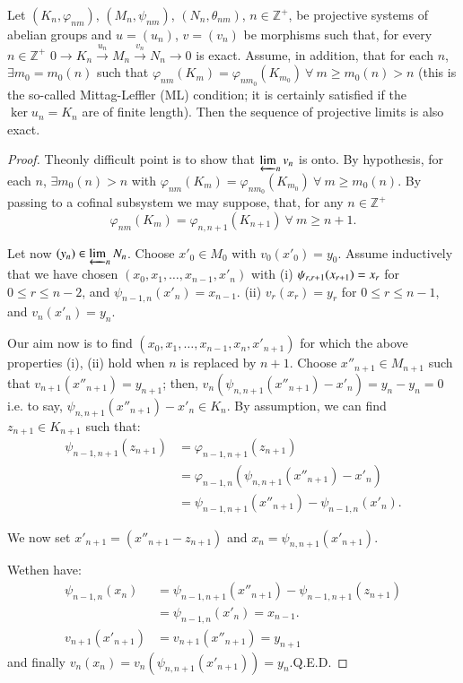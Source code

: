 \setcounter{lemma}{1}
\begin{lemma}\label{chap6-lem6.2.2}
Let $(K_{n},\varphi_{nm})$, $(M_{n},\psi_{nm})$,
$(N_{n},\theta_{nm})$, $n\in \mathbb{Z}^{+}$, be projective systems of
abelian groups and $u=(u_{n})$, $v=(v_{n})$ be morphisms such that,
for every $n\in \mathbb{Z}^{+}$ $0\to
K_{n}\xrightarrow{u_{n}}M_{n}\xrightarrow{v_{n}}N_{n}\to 0$ is
exact. Assume, in addition, that for each $n$, $\exists
m_{0}=m_{0}(n)$ such that
$\varphi_{nm}(K_{m})=\varphi_{nm_{0}}(K_{m_{0}})\ \forall\ m\geq
m_{0}(n)>n$ (this is the so-called Mittag-Leffler (ML) condition; it
is certainly satisfied if the $\ker u_{n}=K_{n}$ are of finite
length). Then the sequence of projective limits is also exact.
\end{lemma}

\begin{proof}
The\pageoriginale only difficult point is to show that
$\varprojlim_{n}v_{n}$ is onto. By hypothesis, for each $n$, $\exists
m_{0}(n)>n$ with
$\varphi_{nm}(K_{m})=\varphi_{nm_{0}}(K_{m_{0}})\ \forall\ m\geq
m_{0}(n)$. By passing to a cofinal subsystem we may suppose, that, for
any $n\in \mathbb{Z}^{+}$ 
$$
\varphi_{nm}(K_{m})=\varphi_{n,n+1}(K_{n+1})\ \forall\ m\geq n+1.
$$

Let now $(y_{n})\in\varprojlim_{n}N_{n}$. Choose $x'_{0}\in M_{0}$
with $v_{0}(x'_{0})=y_{0}$. Assume inductively that we have chosen
$(x_{0},x_{1},\ldots,x_{n-1},x'_{n})$ with (i)
$\psi_{r,r+1}(x_{r+1})\break =x_{r}$ for $0\leq r\leq n-2$, and
  $\psi_{n-1,n}(x'_{n})=x_{n-1}$. (ii) $v_{r}(x_{r})=y_{r}$ for $0\leq
  r\leq n-1$, and $v_{n}(x'_{n})=y_{n}$.

Our aim now is to find $(x_{0},x_{1},\ldots,x_{n-1},x_{n},x'_{n+1})$
for which the above properties (i), (ii) hold when $n$ is replaced by
$n+1$. Choose $x''_{n+1}\in M_{n+1}$ such that
$v_{n+1}(x''_{n+1})=y_{n+1}$; then,
$v_{n}(\psi_{n,n+1}(x''_{n+1})-x'_{n})=y_{n}-y_{n}=0$ i.e. to say,
$\psi_{n,n+1}(x''_{n+1})-x'_{n}\in K_{n}$. By assumption, we can find
$z_{n+1}\in K_{n+1}$ such that:
\begin{align*}
\psi_{n-1,n+1}(z_{n+1}) &= \varphi_{n-1,n+1}(z_{n+1})\\
&= \varphi_{n-1,n}(\psi_{n,n+1}(x''_{n+1})-x'_{n})\\
&= \psi_{n-1,n+1}(x''_{n+1})-\psi_{n-1,n}(x'_{n}).
\end{align*}

We now set $x'_{n+1}=(x''_{n+1}-z_{n+1})$ and
$x_{n}=\psi_{n,n+1}(x'_{n+1})$. 

We\pageoriginale then have:
\begin{align*}
\psi_{n-1,n}(x_{n}) &=
\psi_{n-1,n+1}(x''_{n+1})-\psi_{n-1,n+1}(z_{n+1})\\
&= \psi_{n-1,n}(x'_{n})=x_{n-1}.\\
v_{n+1}(x'_{n+1}) &= v_{n+1}(x''_{n+1})=y_{n+1}
\end{align*}
and finally $v_{n}(x_{n})=v_{n}(\psi_{n,n+1}(x'_{n+1}))=y_{n}$.\hfill Q.E.D.
\end{proof}


